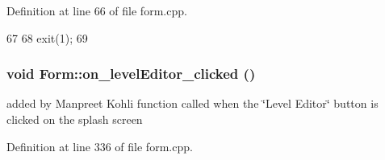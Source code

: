 Definition at line 66 of file form.cpp.


\begin{DoxyCode}
67 {
68     exit(1);
69 }
\end{DoxyCode}
\hypertarget{class_form_af6626ed5a42cba30ec1e37f991940d58}{
\subsubsection[{on\_\-levelEditor\_\-clicked}]{\setlength{\rightskip}{0pt plus 5cm}void Form::on\_\-levelEditor\_\-clicked ()}}
\label{class_form_af6626ed5a42cba30ec1e37f991940d58}
added by Manpreet Kohli function called when the \char`\"{}Level Editor\char`\"{} button is clicked on the splash screen 

Definition at line 336 of file form.cpp.


